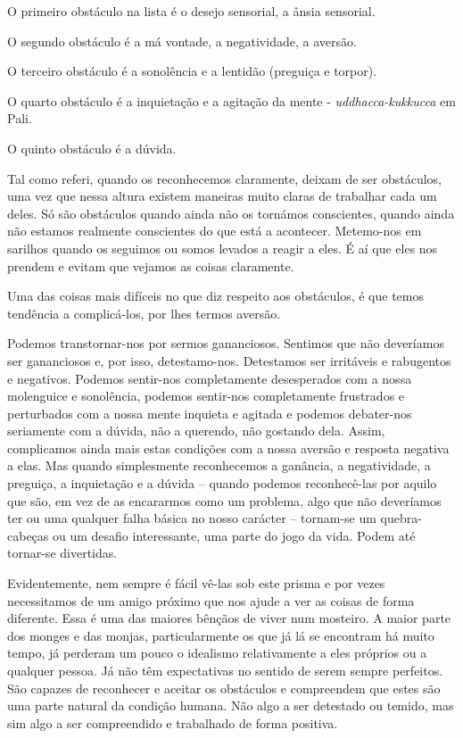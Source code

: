 O primeiro obstáculo na lista é o desejo sensorial, a ânsia sensorial.

O segundo obstáculo é a má vontade, a negatividade, a aversão.

O terceiro obstáculo é a sonolência e a lentidão (preguiça e torpor).

O quarto obstáculo é a inquietação e a agitação da mente -
\emph{uddhacca-kukkucca} em Pali.

O quinto obstáculo é a dúvida.

Tal como referi, quando os reconhecemos claramente, deixam de ser
obstáculos, uma vez que nessa altura existem maneiras muito claras de
trabalhar cada um deles. Só são obstáculos quando ainda não os tornámos
conscientes, quando ainda não estamos realmente conscientes do que está
a acontecer. Metemo-nos em sarilhos quando os seguimos ou somos levados
a reagir a eles. É aí que eles nos prendem e evitam que vejamos as
coisas claramente.

Uma das coisas mais difíceis no que diz respeito aos obstáculos, é que
temos tendência a complicá-los, por lhes termos aversão.

Podemos transtornar-nos por sermos gananciosos. Sentimos que não
deveríamos ser gananciosos e, por isso, detestamo-nos. Detestamos ser
irritáveis e rabugentos e negativos. Podemos sentir-nos completamente
desesperados com a nossa molenguice e sonolência, podemos sentir-nos
completamente frustrados e perturbados com a nossa mente inquieta e
agitada e podemos debater-nos seriamente com a dúvida, não a querendo,
não gostando dela. Assim, complicamos ainda mais estas condições com a
nossa aversão e resposta negativa a elas. Mas quando simplesmente
reconhecemos a ganância, a negatividade, a preguiça, a inquietação e a
dúvida -- quando podemos reconhecê-las por aquilo que são, em vez de as
encararmos como um problema, algo que não deveríamos ter ou uma qualquer
falha básica no nosso carácter -- tornam-se um quebra-cabeças ou um
desafio interessante, uma parte do jogo da vida. Podem até tornar-se
divertidas.

Evidentemente, nem sempre é fácil vê-las sob este prisma e por vezes
necessitamos de um amigo próximo que nos ajude a ver as coisas de forma
diferente. Essa é uma das maiores bênçãos de viver num mosteiro. A maior
parte dos monges e das monjas, particularmente os que já lá se encontram
há muito tempo, já perderam um pouco o idealismo relativamente a eles
próprios ou a qualquer pessoa. Já não têm expectativas no sentido de
serem sempre perfeitos. São capazes de reconhecer e aceitar os
obstáculos e compreendem que estes são uma parte natural da condição
humana. Não algo a ser detestado ou temido, mas sim algo a ser
compreendido e trabalhado de forma positiva.

